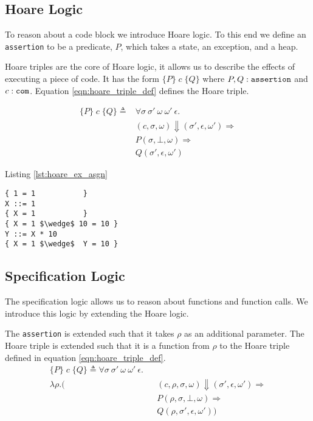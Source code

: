 \subsection{Hoare Logic}
To reason about a code block we introduce Hoare logic. To this end we define an \verb|assertion| to be a predicate, $P$, which takes a state, an exception, and a heap.

Hoare triples are the core of Hoare logic, it allows us to describe the effects of executing a piece of code. It has the form $\{P\}\;c\;\{Q\}$ where $P,Q : \verb|assertion|$ and $c : \verb|com|$.
Equation \ref{eqn:hoare_triple_def} defines the Hoare triple.

\begin{equation}\label{eqn:hoare_triple_def}
\begin{alignedat}{1}
\{P\}\;c\;\{Q\} \triangleq &\forall \sigma \: \sigma' \: \omega \: \omega' \: \epsilon .\\
& (c,\sigma,\omega) \Downarrow (\sigma', \epsilon, \omega') \Rightarrow\\
& P(\sigma,\bot,\omega) \Rightarrow\\
& Q(\sigma',\epsilon,\omega')
\end{alignedat}
\end{equation}

Listing \ref{lst:hoare_ex_asgn}

\begin{lstlisting}[mathescape=true,keepspaces=true,label=lst:hoare_ex_asgn,caption=A simple code block proven using Hoare triples.]
{ 1 = 1           }
X ::= 1
{ X = 1           }
{ X = 1 $\wedge$ 10 = 10 }
Y ::= X * 10
{ X = 1 $\wedge$  Y = 10 }
\end{lstlisting}

\subsection{Specification Logic}
The specification logic allows us to reason about functions and function calls. We introduce this logic by extending the Hoare logic.

The \verb|assertion| is extended such that it takes $\rho$ as an additional parameter. The Hoare triple is extended such that it is a function from $\rho$ to the Hoare triple defined in equation \ref{eqn:hoare_triple_def}.
\begin{equation}
\begin{alignedat}{2}
\{P\}\;c\;\{Q\} \triangleq \forall \sigma \: \sigma' \: \omega \: \omega' \: \epsilon .\\
 \lambda\rho.(
  && (c,\rho,\sigma,\omega) \Downarrow (\sigma', \epsilon, \omega') \Rightarrow\\
&& P(\rho,\sigma,\bot,\omega) \Rightarrow\\
&& Q(\rho,\sigma',\epsilon,\omega'))
\end{alignedat}
\end{equation}
